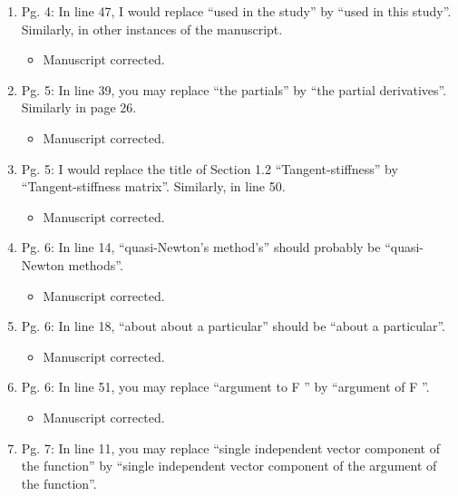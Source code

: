 \documentclass{article}
\begin{document}
\begin{enumerate}
\begin{enumerate}
 \item Pg. 4: In line 47, I would replace “used in the study” by “used in this study”. Similarly,
in other instances of the manuscript.

{\color{red}  
\begin{itemize}
     \item
 Manuscript corrected. 
  \end{itemize}}

 \item Pg. 5: In line 39, you may replace “the partials” by “the partial derivatives”. Similarly
in page 26.

{\color{red}  
\begin{itemize}
     \item
 Manuscript corrected. 
  \end{itemize}}

 \item Pg. 5: I would replace the title of Section 1.2 “Tangent-stiffness” by “Tangent-stiffness
matrix”. Similarly, in line 50.

{\color{red}  
\begin{itemize}
     \item
 Manuscript corrected. 
  \end{itemize}}

 \item Pg. 6: In line 14, “quasi-Newton’s method’s” should probably be “quasi-Newton
methods”.

{\color{red}  
\begin{itemize}
     \item
 Manuscript corrected. 
  \end{itemize}}

 \item Pg. 6: In line 18, “about about a particular” should be “about a particular”.

{\color{red}  
\begin{itemize}
     \item
 Manuscript corrected. 
  \end{itemize}}

 \item Pg. 6: In line 51, you may replace “argument to F ” by “argument of F ”.

{\color{red}  
\begin{itemize}
     \item
 Manuscript corrected. 
  \end{itemize}}

 \item Pg. 7: In line 11, you may replace “single independent vector component of the
function” by “single independent vector component of the argument of the function”.


\end{enumerate}
\end{enumerate}
\end{document}
